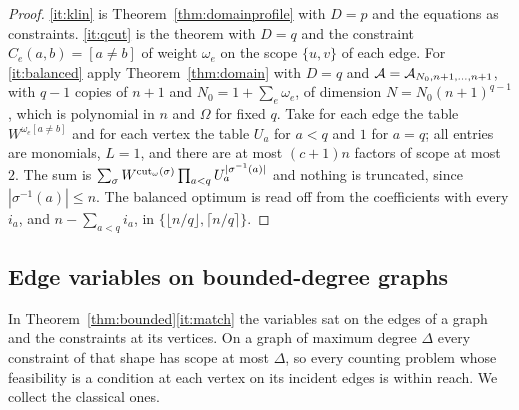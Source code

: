 \begin{proof}
\ref{it:klin} is Theorem~\ref{thm:domainprofile} with $D=p$ and the equations as
constraints. \ref{it:qcut} is the theorem with $D=q$ and the constraint
$C_e(a,b)=[a\ne b]$ of weight $\omega_e$ on the scope $\{u,v\}$ of each edge.
For \ref{it:balanced} apply Theorem~\ref{thm:domain} with $D=q$ and
$\mathcal{A}=\mathcal{A}_{N_0,n+1,\dots,n+1}$, with $q-1$ copies of $n+1$ and
$N_0=1+\sum_e\omega_e$, of dimension $N=N_0(n+1)^{q-1}$, which is polynomial in
$n$ and $\Omega$ for fixed $q$. Take for each edge the table
$W^{\omega_e[a\ne b]}$ and for each vertex the table $U_a$ for $a<q$ and $1$ for
$a=q$; all entries are monomials, $L=1$, and there are at most $(c+1)n$ factors
of scope at most $2$. The sum is
$\sum_\sigma W^{\operatorname{cut}_\omega(\sigma)}\prod_{a<q}U_a^{|\sigma^{-1}(a)|}$ and nothing
is truncated, since $|\sigma^{-1}(a)|\le n$. The balanced optimum is read off
from the coefficients with every $i_a$, and $n-\sum_{a<q}i_a$, in
$\{\lfloor n/q\rfloor,\lceil n/q\rceil\}$.
\end{proof}

\subsection{Edge variables on bounded-degree graphs}\label{ssec:edges}
In Theorem~\ref{thm:bounded}\ref{it:match} the variables sat on the edges of a
graph and the constraints at its vertices. On a graph of maximum degree
$\Delta$ every constraint of that shape has scope at most $\Delta$, so every
counting problem whose feasibility is a condition at each vertex on its
incident edges is within reach. We collect the classical ones.

